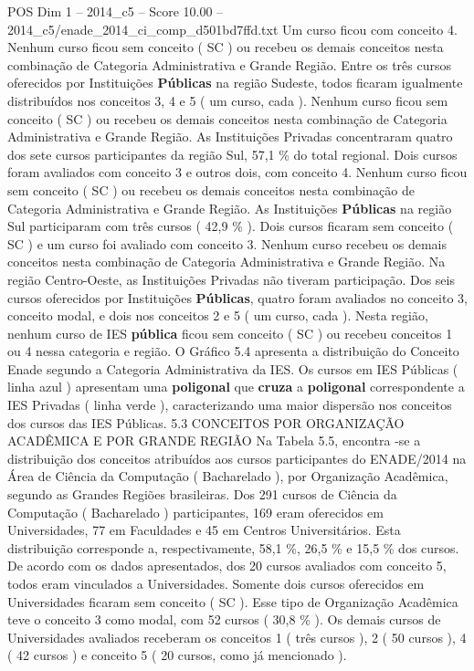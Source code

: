 \begin{textsample}{POS Dim 1 – 2014\_c5 – Score 10.00 – 2014\_c5/enade\_2014\_ci\_comp\_d501bd7ffd.txt}
Um curso ficou com conceito 4.
Nenhum curso ficou sem conceito ( SC ) ou recebeu os demais conceitos nesta combinação de Categoria Administrativa e Grande Região.
Entre os três cursos oferecidos por Instituições \textbf{Públicas} na região Sudeste, todos ficaram igualmente distribuídos nos conceitos 3, 4 e 5 ( um curso, cada ).
Nenhum curso ficou sem conceito ( SC ) ou recebeu os demais conceitos nesta combinação de Categoria Administrativa e Grande Região.
As Instituições Privadas concentraram quatro dos sete cursos participantes da região Sul, 57,1 \% do total regional.
Dois cursos foram avaliados com conceito 3 e outros dois, com conceito 4.
Nenhum curso ficou sem conceito ( SC ) ou recebeu os demais conceitos nesta combinação de Categoria Administrativa e Grande Região.
As Instituições \textbf{Públicas} na região Sul participaram com três cursos ( 42,9 \% ).
Dois cursos ficaram sem conceito ( SC ) e um curso foi avaliado com conceito 3.
Nenhum curso recebeu os demais conceitos nesta combinação de Categoria Administrativa e Grande Região.
Na região Centro-Oeste, as Instituições Privadas não tiveram participação.
Dos seis cursos oferecidos por Instituições \textbf{Públicas}, quatro foram avaliados no conceito 3, conceito modal, e dois nos conceitos 2 e 5 ( um curso, cada ).
Nesta região, nenhum curso de IES \textbf{pública} ficou sem conceito ( SC ) ou recebeu conceitos 1 ou 4 nessa categoria e região.
O Gráfico 5.4 apresenta a distribuição do Conceito Enade segundo a Categoria Administrativa da IES.
Os cursos em IES Públicas ( linha azul ) apresentam uma \textbf{poligonal} que \textbf{cruza} a \textbf{poligonal} correspondente a IES Privadas ( linha verde ), caracterizando uma maior dispersão nos conceitos dos cursos das IES Públicas. 5.3 CONCEITOS POR ORGANIZAÇÃO ACADÊMICA E POR GRANDE REGIÃO Na Tabela 5.5, encontra -se a distribuição dos conceitos atribuídos aos cursos participantes do ENADE/2014 na Área de Ciência da Computação ( Bacharelado ), por Organização Acadêmica, segundo as Grandes Regiões brasileiras.
Dos 291 cursos de Ciência da Computação ( Bacharelado ) participantes, 169 eram oferecidos em Universidades, 77 em Faculdades e 45 em Centros Universitários.
Esta distribuição corresponde a, respectivamente, 58,1 \%, 26,5 \% e 15,5 \% dos cursos.
De acordo com os dados apresentados, dos 20 cursos avaliados com conceito 5, todos eram vinculados a Universidades.
Somente dois cursos oferecidos em Universidades ficaram sem conceito ( SC ).
Esse tipo de Organização Acadêmica teve o conceito 3 como modal, com 52 cursos ( 30,8 \% ).
Os demais cursos de Universidades avaliados receberam os conceitos 1 ( três cursos ), 2 ( 50 cursos ), 4 ( 42 cursos ) e conceito 5 ( 20 cursos, como já mencionado ).

\end{textsample}
